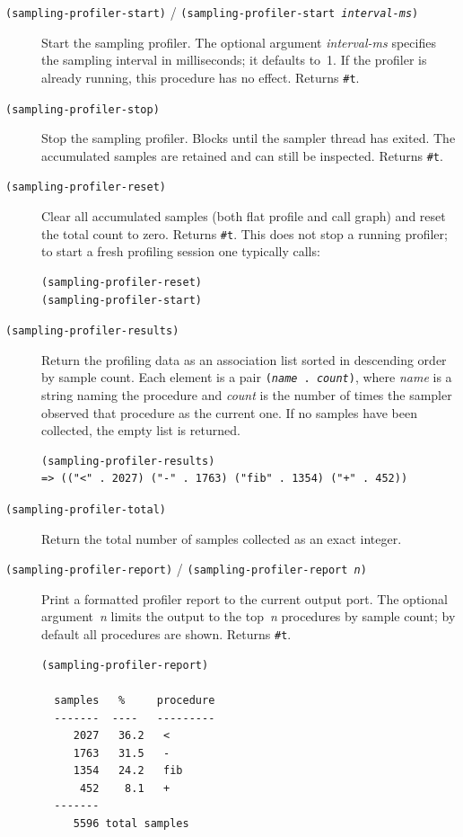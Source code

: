 \begin{description}

\item[{\tt (sampling-profiler-start)} / {\tt (sampling-profiler-start {\it interval-ms})}]
  Start the sampling profiler.  The optional argument {\it interval-ms\/}
  specifies the sampling interval in milliseconds; it defaults to~1.
  If the profiler is already running, this procedure has no effect.
  Returns {\tt \#t}.

\item[{\tt (sampling-profiler-stop)}]
  Stop the sampling profiler.  Blocks until the sampler thread has
  exited.  The accumulated samples are retained and can still be
  inspected.  Returns {\tt \#t}.

\item[{\tt (sampling-profiler-reset)}]
  Clear all accumulated samples (both flat profile and call graph) and
  reset the total count to zero.
  Returns {\tt \#t}.  This does not stop a running profiler; to start a
  fresh profiling session one typically calls:
\begin{lstlisting}[language=Scheme]
(sampling-profiler-reset)
(sampling-profiler-start)
\end{lstlisting}

\item[{\tt (sampling-profiler-results)}]
  Return the profiling data as an association list sorted in descending
  order by sample count.  Each element is a pair
  {\tt ({\it name\/}~.~{\it count\/})}, where {\it name\/} is a string
  naming the procedure and {\it count\/} is the number of times the
  sampler observed that procedure as the current one.  If no samples
  have been collected, the empty list is returned.
\begin{lstlisting}[language={}]
(sampling-profiler-results)
=> (("<" . 2027) ("-" . 1763) ("fib" . 1354) ("+" . 452))
\end{lstlisting}

\item[{\tt (sampling-profiler-total)}]
  Return the total number of samples collected as an exact integer.

\item[{\tt (sampling-profiler-report)} / {\tt (sampling-profiler-report {\it n})}]
  Print a formatted profiler report to the current output port.  The
  optional argument~{\it n\/} limits the output to the top~{\it n\/}
  procedures by sample count; by default all procedures are shown.
  Returns {\tt \#t}.
\begin{lstlisting}[language={}]
(sampling-profiler-report)

  samples   %     procedure
  -------  ----   ---------
     2027   36.2   <
     1763   31.5   -
     1354   24.2   fib
      452    8.1   +
  -------
     5596 total samples
\end{lstlisting}

\end{description}

